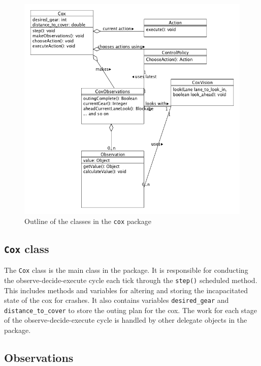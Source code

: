 \begin{figure}
\begin{center}
  \includegraphics[scale=0.3]{images/coxpackageUML.png}
  \caption{Outline of the classes in the \texttt{cox} package}
  \label{software:fig:coxUML}
\end{center}
\end{figure}

\subsection{\texttt{Cox} class}

The \texttt{Cox} class is the main class in the package. It is responsible for conducting the observe-decide-execute cycle each tick through the \texttt{step()} scheduled method. This includes methods and variables for altering and storing the incapacitated state of the cox for crashes. It also contains variables \texttt{desired\_gear} and \texttt{distance\_to\_cover} to store the outing plan for the cox. The work for each stage of the observe-decide-execute cycle is handled by other delegate objects in the package.

\subsection{Observations}

